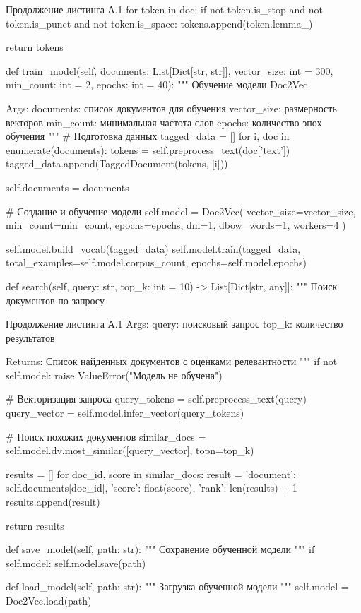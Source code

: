 \begin{manuallisting}[language=Python, firstnumber=42]{Продолжение листинга А.1}
	for token in doc:
	if not token.is_stop and not token.is_punct and not token.is_space:
	tokens.append(token.lemma_)
	
	return tokens
	
	def train_model(self, documents: List[Dict[str, str]], 
	vector_size: int = 300,
	min_count: int = 2,
	epochs: int = 40):
	"""
	Обучение модели Doc2Vec
	
	Args:
	documents: список документов для обучения
	vector_size: размерность векторов
	min_count: минимальная частота слов
	epochs: количество эпох обучения
	"""
	# Подготовка данных
	tagged_data = []
	for i, doc in enumerate(documents):
	tokens = self.preprocess_text(doc['text'])
	tagged_data.append(TaggedDocument(tokens, [i]))
	
	self.documents = documents
	
	# Создание и обучение модели
	self.model = Doc2Vec(
	vector_size=vector_size,
	min_count=min_count,
	epochs=epochs,
	dm=1,
	dbow_words=1,
	workers=4
	)
	
	self.model.build_vocab(tagged_data)
	self.model.train(tagged_data, 
	total_examples=self.model.corpus_count,
	epochs=self.model.epochs)
	
	def search(self, query: str, top_k: int = 10) -> List[Dict[str, any]]:
	"""
	Поиск документов по запросу
\end{manuallisting}

\clearpage

\begin{manuallisting}[language=Python, firstnumber=88]{Продолжение листинга А.1}
	Args:
	query: поисковый запрос
	top_k: количество результатов
	
	Returns:
	Список найденных документов с оценками релевантности
	"""
	if not self.model:
	raise ValueError("Модель не обучена")
	
	# Векторизация запроса
	query_tokens = self.preprocess_text(query)
	query_vector = self.model.infer_vector(query_tokens)
	
	# Поиск похожих документов
	similar_docs = self.model.dv.most_similar([query_vector], topn=top_k)
	
	results = []
	for doc_id, score in similar_docs:
	result = {
		'document': self.documents[doc_id],
		'score': float(score),
		'rank': len(results) + 1
	}
	results.append(result)
	
	return results
	
	def save_model(self, path: str):
	"""
	Сохранение обученной модели
	"""
	if self.model:
	self.model.save(path)
	
	def load_model(self, path: str):
	"""
	Загрузка обученной модели
	"""
	self.model = Doc2Vec.load(path)
\end{manuallisting}


